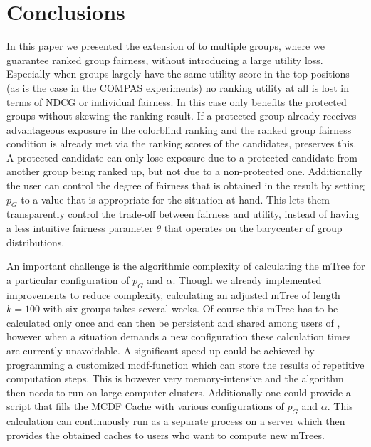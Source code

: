 \section{Conclusions}\label{sec:conclusions}

In this paper we presented the extension of \algoFAIR to multiple groups, where we guarantee ranked group fairness, without introducing a large utility loss.
%
Especially when groups largely have the same utility score in the top positions (as is the case in the COMPAS experiments) no ranking utility at all is lost in terms of NDCG or individual fairness. 
%
In this case \algoFAIR only benefits the protected groups without skewing the ranking result.
%
If a protected group already receives advantageous exposure in the colorblind ranking and the ranked group fairness condition is already met via the ranking scores of the candidates, \algoFAIR preserves this. 
%
A protected candidate can only lose exposure due to a protected candidate from another group being ranked up, but not due to a non-protected one.
%
Additionally the user can control the degree of fairness that is obtained in the result by setting $p_G$ to a value that is appropriate for the situation at hand.
%
This lets them transparently control the trade-off between fairness and utility, instead of having a less intuitive fairness parameter $\theta$ that operates on the barycenter of group distributions.

%
An important challenge is the algorithmic complexity of calculating the mTree for a particular configuration of $p_G$ and $\alpha$.
%
Though we already implemented improvements to reduce complexity, calculating an adjusted mTree of length $k=100$ with six groups takes several weeks.
%
Of course this mTree has to be calculated only once and can then be persistent and shared among users of \algoFAIR, however when a situation demands a new configuration these calculation times are currently unavoidable.
%
A significant speed-up could be achieved by programming a customized mcdf-function which can store the results of repetitive computation steps. 
%
This is however very memory-intensive and the algorithm then needs to run on large computer clusters.
%
Additionally one could provide a script that fills the MCDF Cache with various configurations of $p_G$ and $\alpha$.
%
This calculation can continuously run as a separate process on a server which then provides the obtained caches to users who want to compute new mTrees.

